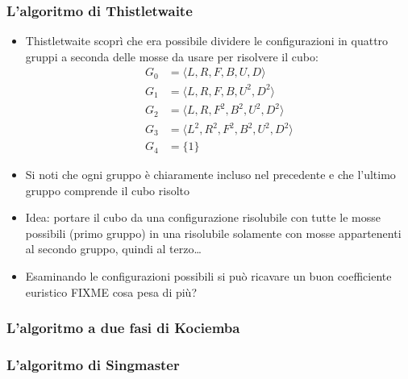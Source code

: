 \documentclass{beamer}
\begin{document}
\begin{frame}
\frametitle{L'algoritmo di Thistletwaite}
\begin{itemize}
\item Thistletwaite scoprì che era possibile dividere le configurazioni in
quattro gruppi a seconda delle mosse da usare per risolvere il cubo:
\begin{align*}
G_0 &= \langle L,R,F,B,U,D\rangle \\
G_1 &= \langle L,R,F,B,U^2,D^2\rangle \\
G_2 &= \langle L,R,F^2,B^2,U^2,D^2\rangle \\
G_3 &= \langle L^2,R^2,F^2,B^2,U^2,D^2\rangle \\
G_4 &= \{1\}
\end{align*}
\item Si noti che ogni gruppo è chiaramente incluso nel precedente e che 
l'ultimo gruppo comprende il cubo risolto
\item Idea: portare il cubo da una configurazione risolubile con tutte le mosse 
possibili (primo gruppo) in una risolubile solamente con mosse appartenenti al
secondo gruppo, quindi al terzo\dots
\item Esaminando le configurazioni possibili si può ricavare un buon 
coefficiente euristico FIXME cosa pesa di più?
\end{itemize}
\end{frame}

\begin{frame}
\frametitle{L'algoritmo a due fasi di Kociemba}
\end{frame}

\begin{frame}
\frametitle{L'algoritmo di Singmaster}
\end{frame}
\end{document}
